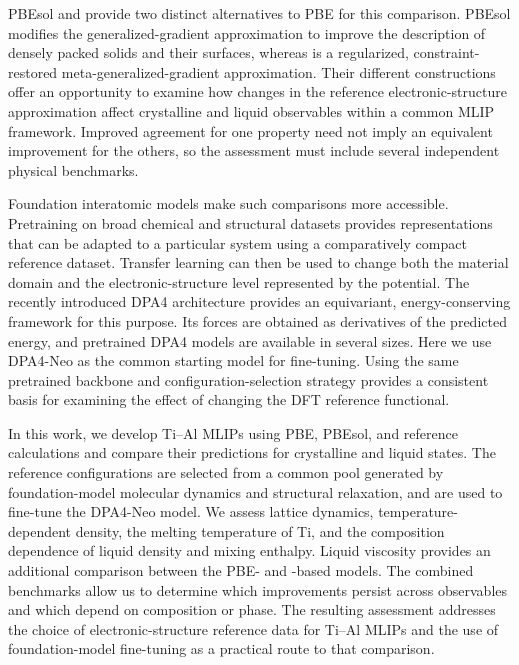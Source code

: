 PBEsol and \rscan{} provide two distinct alternatives to PBE for this comparison.
PBEsol modifies the generalized-gradient approximation to improve the description of densely packed solids and their surfaces,\cite{Perdew2008} whereas \rscan{} is a regularized, constraint-restored meta-generalized-gradient approximation.\cite{Furness2020}
Their different constructions offer an opportunity to examine how changes in the reference electronic-structure approximation affect crystalline and liquid observables within a common MLIP framework.
Improved agreement for one property need not imply an equivalent improvement for the others, so the assessment must include several independent physical benchmarks.

Foundation interatomic models make such comparisons more accessible.
Pretraining on broad chemical and structural datasets provides representations that can be adapted to a particular system using a comparatively compact reference dataset.\cite{Batatia2025}
Transfer learning can then be used to change both the material domain and the electronic-structure level represented by the potential.\cite{Khazieva2024}
The recently introduced DPA4 architecture provides an equivariant, energy-conserving framework for this purpose.\cite{Li2026DPA4}
Its forces are obtained as derivatives of the predicted energy, and pretrained DPA4 models are available in several sizes.
Here we use DPA4-Neo as the common starting model for fine-tuning.
Using the same pretrained backbone and configuration-selection strategy provides a consistent basis for examining the effect of changing the DFT reference functional.

In this work, we develop Ti--Al MLIPs using PBE, PBEsol, and \rscan{} reference calculations and compare their predictions for crystalline and liquid states.
The reference configurations are selected from a common pool generated by foundation-model molecular dynamics and structural relaxation, and are used to fine-tune the DPA4-Neo model.
We assess lattice dynamics, temperature-dependent density, the melting temperature of Ti, and the composition dependence of liquid density and mixing enthalpy.
Liquid viscosity provides an additional comparison between the PBE- and \rscan{}-based models.
The combined benchmarks allow us to determine which improvements persist across observables and which depend on composition or phase.
The resulting assessment addresses the choice of electronic-structure reference data for Ti--Al MLIPs and the use of foundation-model fine-tuning as a practical route to that comparison.

